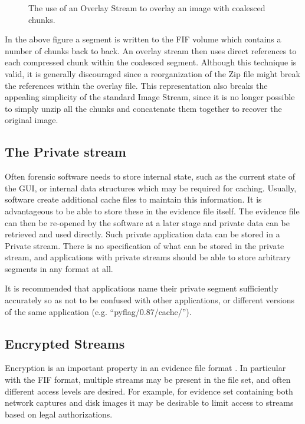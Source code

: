 \documentclass[10pt, conference]{IEEEtran}
\begin{document}
\begin{figure}[tb]
  \begin{center}
  \mbox{\columnwidth {}}
  \caption{The use of an Overlay Stream to overlay an image with
coalesced chunks.}
  \label{overlay}
  \end{center}
\end{figure}

In the above figure a segment is written to the FIF volume which
contains a number of chunks back to back. An overlay stream then uses
direct references to each compressed chunk within the coalesced
segment. Although this technique is valid, it is generally
discouraged since a reorganization of the Zip file might break the
references within the overlay file. This representation also breaks
the appealing simplicity of the standard Image Stream, since it is no
longer possible to simply unzip all the chunks and concatenate them
together to recover the original image.


\subsection{The Private stream}
Often forensic software needs to store internal state, such as the
current state of the GUI, or internal data structures which may be
required for caching. Usually, software create additional cache files
to maintain this information. It is advantageous to be able to store
these in the evidence file itself. The evidence file can then be
re-opened by the software at a later stage and private data can be
retrieved and used directly. Such private application data can be
stored in a Private stream. There is no specification of what can be
stored in the private stream, and applications with private streams
should be able to store arbitrary segments in any format at all.

It is recommended that applications name their private segment
sufficiently accurately so as not to be confused with other
applications, or different versions of the same application
(e.g. ``pyflag/0.87/cache/'').

\subsection{Encrypted Streams}
Encryption is an important property in an evidence file format
\cite{AFF}. In particular with the FIF format, multiple streams may be
present in the file set, and often different access levels are
desired. For example, for evidence set containing both network
captures and disk images it may be desirable to limit access to
streams based on legal authorizations.
\end{document}
